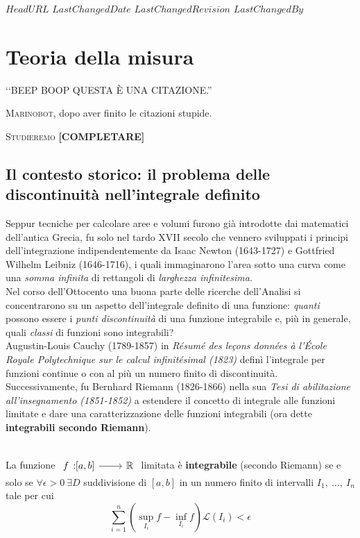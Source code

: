 \svnidlong
{$HeadURL$}
{$LastChangedDate$}
{$LastChangedRevision$}
{$LastChangedBy$}

\chapter{Teoria della misura}

\begin{introduction}
	‘‘BEEP BOOP QUESTA È UNA CITAZIONE.''
\begin{flushright}
	\textsc{Marinobot,} dopo aver finito le citazioni stupide.
\end{flushright}
\end{introduction}
\lettrine[findent=1pt, nindent=0pt]{S}{tudieremo} \textbf{[COMPLETARE]}
\section{Il contesto storico: il problema delle discontinuità nell'integrale definito}
Seppur tecniche per calcolare aree e volumi furono già introdotte dai matematici dell'antica Grecia, fu solo nel tardo XVII secolo che vennero sviluppati i principi dell'integrazione indipendentemente da Isaac Newton (1643-1727) e Gottfried Wilhelm Leibniz (1646-1716), i quali immaginarono l'area sotto una curva come una \textit{somma infinita} di rettangoli di \textit{larghezza infinitesima}.\\
Nel corso dell'Ottocento una buona parte delle ricerche dell'Analisi si concentrarono su un aspetto dell'integrale definito di una funzione: \textit{quanti} possono essere i \textit{punti discontinuità} di una funzione
integrabile e, più in generale, quali \textit{classi} di funzioni sono integrabili?\\
Augustin-Louis Cauchy (1789-1857) in \textit{Résumé des leçons données à	l’École Royale Polytechnique sur le calcul infinitésimal (1823)} definì l'integrale per funzioni continue o con al più un numero finito di discontinuità.\\
Successivamente, fu Bernhard Riemann (1826-1866) nella sua \textit{Tesi di abilitazione all'insegnamento (1851-1852)} a estendere il concetto di integrale alle funzioni limitate e dare una caratterizzazione delle funzioni integrabili (ora dette \textbf{integrabili secondo Riemann}).
\begin{define}~{}\\
La funzione $\funz{f}{\left[a,b\right]}{\realset}$ limitata è \textbf{integrabile} (secondo Riemann) se e solo se $\forall \epsilon>0\ \exists D$ suddivisione di $\left[a,b\right]$ in un numero finito di intervalli $I_1,\ \ldots,\ I_n$ tale per cui
\begin{equation}
	\sum_{i=1}^{n}\left(\sup_{I_i}f-\inf_{I_i}f\right)\mathcal{L}\left(I_i\right)<\epsilon
\end{equation}
\end{define}
